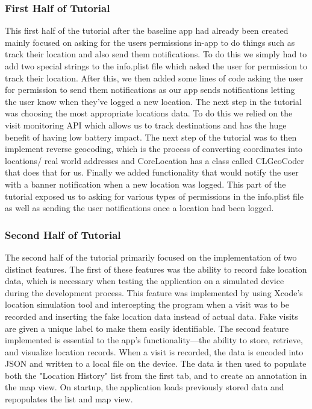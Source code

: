 \documentclass[conference]{IEEEtran}
\begin{document}
\subsubsection{First Half of Tutorial}
This first half of the tutorial after the baseline app had already been 
created mainly focused on asking for the users permissions in-app to do 
things such as track their location and also send them notifications. To do 
this we simply had to add two special strings to the info.plist file which 
asked the user for permission to track their location. After this, we then 
added some lines of code asking the user for permission to send them notifications 
as our app sends notifications letting the user know when they've logged a new 
location. The next step in the tutorial was choosing the most appropriate locations 
data. To do this we relied on the visit monitoring API which allows us to track 
destinations and has the huge benefit of having low battery impact. The next 
step of the tutorial was to then implement reverse geocoding, which is the 
process of converting coordinates into locations/ real world addresses and 
CoreLocation has a class called CLGeoCoder that does that for us. Finally we 
added functionality that would notify the user with a banner notification when 
a new location was logged. This part of the tutorial exposed us to asking for 
various types of permissions in the info.plist file as well as sending the user 
notifications once a location had been logged.

\subsubsection{Second Half of Tutorial}
The second half of the tutorial primarily focused on the implementation of two
distinct features. The first of these features was the ability to record fake
location data, which is necessary when testing the application on a simulated
device during the development process. This feature was implemented by using
Xcode's location simulation tool and intercepting the program when a visit was
to be recorded and inserting the fake location data instead of actual data.
Fake visits are given a unique label to make them easily identifiable. The second
feature implemented is essential to the app's functionality⁠—the ability to store,
retrieve, and visualize location records. When a visit is recorded, the data is 
encoded into JSON and written to a local file on the device. The data is then 
used to populate both the "Location History" list from the first tab, and to
create an annotation in the map view. On startup, the application loads previously
stored data and repopulates the list and map view.
\end{document}
